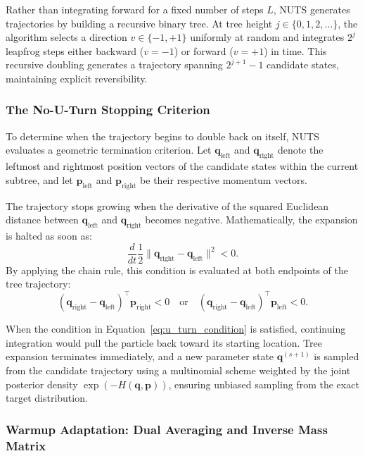 \documentclass[12pt,oneside]{report}
\theoremstyle{definition}
\theoremstyle{remark}
\begin{document}
Rather than integrating forward for a fixed number of steps $L$, NUTS generates trajectories by building a recursive binary tree. At tree height $j \in \{0, 1, 2, \dots\}$, the algorithm selects a direction $v \in \{-1, +1\}$ uniformly at random and integrates $2^j$ leapfrog steps either backward ($v = -1$) or forward ($v = +1$) in time. This recursive doubling generates a trajectory spanning $2^{j+1}-1$ candidate states, maintaining explicit reversibility.

\subsubsection{The No-U-Turn Stopping Criterion}

To determine when the trajectory begins to double back on itself, NUTS evaluates a geometric termination criterion. Let $\mathbf{q}_{\text{left}}$ and $\mathbf{q}_{\text{right}}$ denote the leftmost and rightmost position vectors of the candidate states within the current subtree, and let $\mathbf{p}_{\text{left}}$ and $\mathbf{p}_{\text{right}}$ be their respective momentum vectors. 

The trajectory stops growing when the derivative of the squared Euclidean distance between $\mathbf{q}_{\text{left}}$ and $\mathbf{q}_{\text{right}}$ becomes negative. Mathematically, the expansion is halted as soon as:
\begin{equation}
    \frac{d}{dt} \frac{1}{2} \|\mathbf{q}_{\text{right}} - \mathbf{q}_{\text{left}}\|^2 < 0.
\end{equation}
By applying the chain rule, this condition is evaluated at both endpoints of the tree trajectory:
\begin{equation}
    (\mathbf{q}_{\text{right}} - \mathbf{q}_{\text{left}})^\top \mathbf{p}_{\text{right}} < 0 \quad \text{or} \quad (\mathbf{q}_{\text{right}} - \mathbf{q}_{\text{left}})^\top \mathbf{p}_{\text{left}} < 0.
    \label{eq:u_turn_condition}
\end{equation}

When the condition in Equation~\ref{eq:u_turn_condition} is satisfied, continuing integration would pull the particle back toward its starting location. Tree expansion terminates immediately, and a new parameter state $\mathbf{q}^{(s+1)}$ is sampled from the candidate trajectory using a multinomial scheme weighted by the joint posterior density $\exp(-H(\mathbf{q}, \mathbf{p}))$, ensuring unbiased sampling from the exact target distribution.

\subsubsection{Warmup Adaptation: Dual Averaging and Inverse Mass Matrix}
\end{document}
